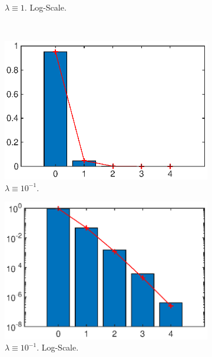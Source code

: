 \documentclass{amsart}
\numberwithin{equation}{section}
\begin{document}
\begin{figure}[ht]
\begin{subfigure}[t]{0.475\textwidth}
        \caption{$\lambda \equiv 1$. Log-Scale.}
    \end{subfigure}
    \\
    \begin{subfigure}[t]{0.475\textwidth}
        \centering
        \includegraphics[width=\textwidth]{poissproc01_1_1.eps}
        \caption{$\lambda \equiv 10^{-1}$.}
    \end{subfigure}
    \hfill
    \begin{subfigure}[t]{0.475\textwidth}
        \centering
        \includegraphics[width=\textwidth]{poissproc01_1_2.eps}
        \caption{$\lambda \equiv 10^{-1}$. Log-Scale.}
    \end{subfigure}
    \\
    \begin{subfigure}[t]{0.475\textwidth}
        \centering

\end{subfigure}
\end{figure}
\end{document}
